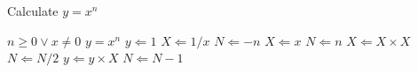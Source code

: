 \begin{algorithm} [tbh]                     %
\caption{Calculate $y = x^n$}          %
\label{alg1}                           %
\begin{algorithmic}                    %
    \REQUIRE $n \geq 0 \vee x \neq 0$
    \ENSURE $y = x^n$
    \STATE $y \Leftarrow 1$
        \STATE $X \Leftarrow 1 / x$
        \STATE $N \Leftarrow -n$
    \ELSE
        \STATE $X \Leftarrow x$
        \STATE $N \Leftarrow n$
    \ENDIF
            \STATE $X \Leftarrow X \times X$
            \STATE $N \Leftarrow N / 2$
        \ELSE[$N$ is odd]
            \STATE $y \Leftarrow y \times X$
            \STATE $N \Leftarrow N - 1$
        \ENDIF
    \ENDWHILE
\end{algorithmic}
\end{algorithm}
